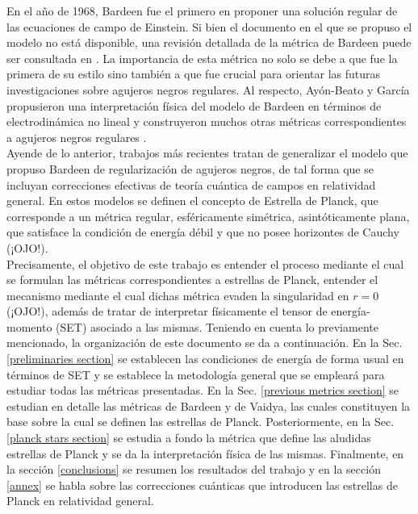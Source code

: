 \documentclass{article}
\numberwithin{equation}{section}
\theoremstyle{definition}
\begin{document}
En el año de 1968, Bardeen fue el primero en proponer una solución regular de las ecuaciones de campo de Einstein. Si bien el documento \cite{bardeen} en el que se propuso el modelo no está disponible, una revisión detallada de la métrica de Bardeen puede ser consultada en \cite{borde1994}. La importancia de esta métrica no solo se debe a que fue la primera de su estilo sino también a que fue crucial para orientar las futuras investigaciones sobre agujeros negros regulares. Al respecto, Ayón-Beato y García propusieron una interpretación física del modelo de Bardeen en términos de electrodinámica no lineal  \cite{ayon-beato2000} y construyeron muchos otras métricas correspondientes a agujeros negros regulares \cite{ayon-beato2005,ayon-beato1999-1,ayon-beato1999-2,ayon-beato1999-3}.\\

Ayende de lo anterior, trabajos más recientes \cite{hayward2006,lorenzo,rovelli} tratan de generalizar el modelo que propuso Bardeen de regularización de agujeros negros, de tal forma que se incluyan correcciones efectivas de teoría cuántica de campos en relatividad general. En estos modelos se definen el concepto de Estrella de Planck, que corresponde a un métrica regular, esféricamente simétrica, asintóticamente plana, que satisface la condición de energía débil y que no posee horizontes de Cauchy (¡OJO!).\\

Precisamente, el objetivo de este trabajo es entender el proceso mediante el cual se formulan las métricas correspondientes a estrellas de Planck, entender el mecanismo mediante el cual dichas métrica evaden la singularidad en $r = 0$ (¡OJO!), además de tratar de interpretar físicamente el tensor de energía-momento (SET) asociado a las mismas. Teniendo en cuenta lo previamente mencionado, la organización de este documento se da a continuación. En la Sec. \ref{preliminaries section} se establecen las condiciones de energía de forma usual en términos de SET y se establece la metodología general que se empleará para estudiar todas las métricas presentadas. En la Sec. \ref{previous metrics section} se estudian en detalle las métricas de Bardeen y de Vaidya, las cuales constituyen la base sobre la cual se definen las estrellas de Planck. Posteriormente, en la Sec. \ref{planck stars section} se estudia a fondo la métrica que define las aludidas estrellas de Planck y se da la interpretación física de las mismas. Finalmente, en la sección \ref{conclusions} se resumen los resultados del trabajo y en la sección \ref{annex} se habla sobre las correcciones cuánticas que introducen las estrellas de Planck en relatividad general.\\
\end{document}

